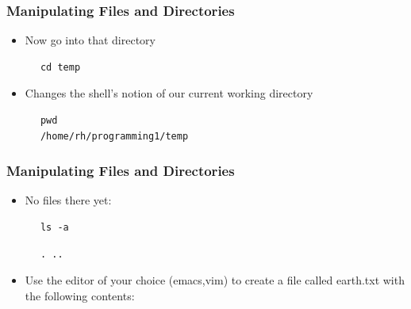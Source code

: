 \documentclass{beamer}
\begin{document}
\begin{frame}[fragile]\frametitle{Manipulating Files and Directories}
\begin{itemize}
\item Now go into that directory
\end{itemize}
\begin{block}{}
\begin{lstlisting}
      cd temp
\end{lstlisting}
\end{block}
\begin{itemize}
\item Changes the shell's notion of our current working directory
\end{itemize}
\begin{block}{}
\begin{lstlisting}
      pwd 
      /home/rh/programming1/temp
\end{lstlisting}
\end{block}
\end{frame}

\begin{frame}[fragile]\frametitle{Manipulating Files and Directories}
\begin{itemize}
\item No files there yet:
\end{itemize}
\begin{lstlisting}
      ls -a
\end{lstlisting}
\begin{lstlisting}
      . ..
\end{lstlisting}
\begin{itemize}
\item Use the editor of your choice (emacs,vim) to create a file called earth.txt with the following contents:
\end{itemize}

\end{frame}
\end{document}
